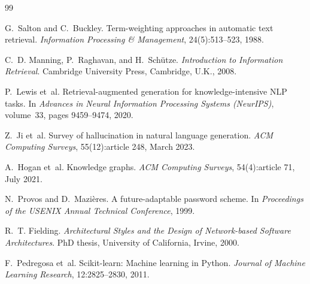 %

\renewcommand{\bibname}{Bibliography}

\begin{thebibliography}{99}

G.~Salton and C.~Buckley.
\newblock Term-weighting approaches in automatic text retrieval.
\newblock \emph{Information Processing \& Management}, 24(5):513--523, 1988.

C.~D. Manning, P.~Raghavan, and H.~Sch{\"u}tze.
\newblock \emph{Introduction to Information Retrieval}.
\newblock Cambridge University Press, Cambridge, U.K., 2008.

P.~Lewis et~al.
\newblock Retrieval-augmented generation for knowledge-intensive {NLP} tasks.
\newblock In \emph{Advances in Neural Information Processing Systems (NeurIPS)},
  volume~33, pages 9459--9474, 2020.

Z.~Ji et~al.
\newblock Survey of hallucination in natural language generation.
\newblock \emph{ACM Computing Surveys}, 55(12):article 248, March 2023.

A.~Hogan et~al.
\newblock Knowledge graphs.
\newblock \emph{ACM Computing Surveys}, 54(4):article 71, July 2021.

N.~Provos and D.~Mazi{\`e}res.
\newblock A future-adaptable password scheme.
\newblock In \emph{Proceedings of the USENIX Annual Technical Conference}, 1999.

R.~T. Fielding.
\newblock \emph{Architectural Styles and the Design of Network-based Software
  Architectures}.
\newblock PhD thesis, University of California, Irvine, 2000.

F.~Pedregosa et~al.
\newblock Scikit-learn: Machine learning in {P}ython.
\newblock \emph{Journal of Machine Learning Research}, 12:2825--2830, 2011.


\end{thebibliography}
